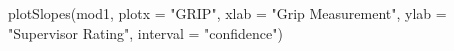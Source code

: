 \begin{Schunk}
\begin{Sinput}
 plotSlopes(mod1, plotx = "GRIP", xlab = "Grip Measurement", ylab = "Supervisor Rating", interval = "confidence")
\end{Sinput}
\end{Schunk}
